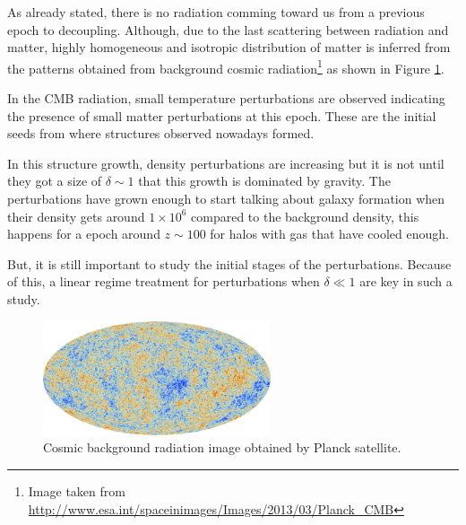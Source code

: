 As already stated, there is no radiation comming toward us from a previous 
epoch to decoupling. Although, due to the last scattering between radiation
and matter, highly homogeneous and isotropic distribution of matter is
inferred from the patterns obtained from background cosmic radiation\footnote{
Image taken from \url{http://www.esa.int/spaceinimages/Images/2013/03/Planck_CMB}} 
as shown in Figure \ref{CMB}.

In the CMB radiation, small temperature perturbations are observed indicating 
the presence of small matter perturbations at this epoch. These are the initial 
seeds from where structures observed nowadays formed. 


In this structure growth, density perturbations are increasing but it is not
until they got a size of $\delta\sim 1$ that this growth is dominated by gravity. 
The perturbations have grown enough to start talking 
about galaxy formation when their density gets around $1\times 10^6$ compared to
the background density, this happens for a epoch around $z\sim 100$ for halos with gas 
that have cooled enough.

But, it is still important to study the initial stages of the perturbations.
Because of this, a linear regime treatment for perturbations when $\delta\ll 1$
are key in such a study. 

\begin{figure}[htbp]
       \centering
               \includegraphics[width=0.6\textwidth]{Images/chapter2/Planck.jpg}
       \caption{\small Cosmic background radiation image obtained by Planck satellite.}
       \label{CMB}
 \end{figure}


